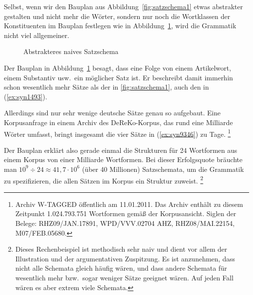 Selbst, wenn wir den Bauplan aus Abbildung~\ref{fig:satzschema1} etwas abstrakter gestalten und nicht mehr die Wörter, sondern nur noch die Wortklassen der Konstituenten im Bauplan festlegen wie in Abbildung~\ref{fig:satzschema2}, wird die Grammatik nicht viel allgemeiner.

\begin{figure}
  \centering
  \caption{Abstrakteres naives Satzschema}
  \label{fig:satzschema2}
\end{figure}

Der Bauplan in Abbildung~\ref{fig:satzschema2} besagt, dass eine Folge von einem Artikelwort, einem Substantiv usw.\ ein möglicher Satz ist.
Er beschreibt damit immerhin schon wesentlich mehr Sätze als der in \ref{fig:satzschema1}, \zB auch den in (\ref{ex:syn1493}).

\begin{exe}
\end{exe}

Allerdings sind nur sehr wenige deutsche Sätze genau so aufgebaut.
Eine Korpusanfrage in einem Archiv des DeReKo-Korpus, das rund eine Milliarde Wörter umfasst, bringt insgesamt die vier Sätze in (\ref{ex:syn9346}) zu Tage.%
\footnote{Archiv W-TAGGED öffentlich am 11.01.2011.
Das Archiv enthält zu diesem Zeitpunkt 1.024.793.751 Wortformen gemäß der Korpusansicht.
Siglen der Belege: RHZ09/JAN.17891, WPD/VVV.02704 AHZ, RHZ08/MAI.22154, M07/FEB.05680.}

\begin{exe}
  \ex \label{ex:syn9346}
  \begin{xlist}
  \end{xlist}
\end{exe}

Der Bauplan erklärt also gerade einmal die Strukturen für 24 Wortformen aus einem Korpus von einer Milliarde Wortformen.
Bei dieser Erfolgsquote bräuchte man $10^9\div24\approx41,7\cdot10^6$ (über 40 Millionen) Satzschemata, um die Grammatik zu spezifizieren, die allen Sätzen im Korpus ein Struktur zuweist.%
\footnote{Dieses Rechenbeispiel ist methodisch sehr naiv und dient vor allem der Illustration und der argumentativen Zuspitzung.
Es ist \zB anzunehmen, dass nicht alle Schemata gleich häufig wären, und dass andere Schemata für wesentlich mehr bzw.\ sogar weniger Sätze geeignet wären.
Auf jeden Fall wären es aber extrem viele Schemata.}


